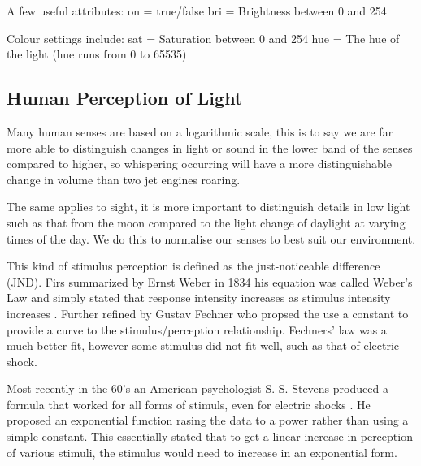 A few useful attributes: on = true/false bri = Brightness between 0 and
254

Colour settings include: sat = Saturation between 0 and 254 hue = The
hue of the light (hue runs from 0 to 65535)

\subsection{Human Perception of Light}\label{human-perception-of-light}

Many human senses are based on a logarithmic scale, this is to say we
are far more able to distinguish changes in light or sound in the lower
band of the senses compared to higher, so whispering occurring will have
a more distinguishable change in volume than two jet engines roaring.

The same applies to sight, it is more important to distinguish details
in low light such as that from the moon compared to the light change of
daylight at varying times of the day. We do this to normalise our senses
to best suit our environment.

This kind of stimulus perception is defined as the just-noticeable
difference (JND). Firs summarized by Ernst Weber in 1834 his equation
was called Weber's Law and simply stated that response intensity
increases as stimulus intensity increases
\parencite[p. 1613-1615]{salkind2010encyclopedia}. Further refined by
Gustav Fechner who propsed the use a constant to provide a curve to the
stimulus/perception relationship. Fechners' law was a much better fit,
however some stimulus did not fit well, such as that of electric shock.

Most recently in the 60's an American psychologist S. S. Stevens
produced a formula that worked for all forms of stimuls, even for
electric shocks \parencite{stevens1957psychophysical}. He proposed an
exponential function rasing the data to a power rather than using a
simple constant. This essentially stated that to get a linear increase
in perception of various stimuli, the stimulus would need to increase in
an exponential form.

